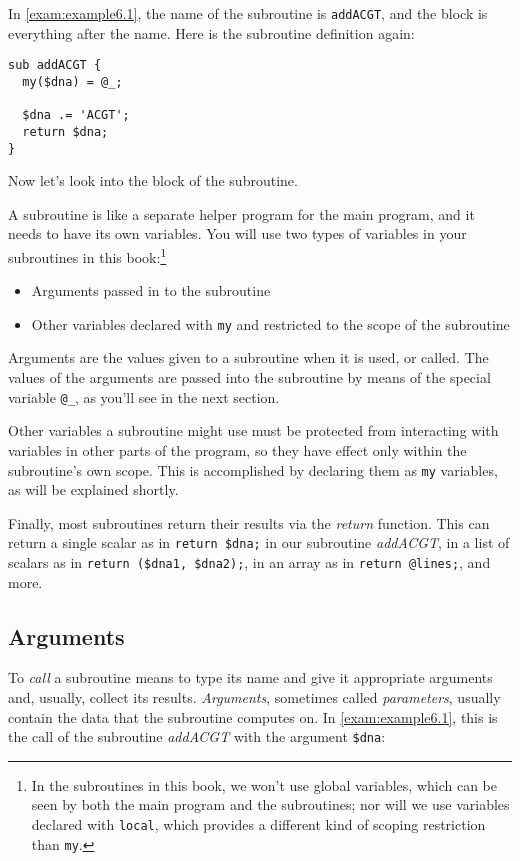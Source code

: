 In \autoref{exam:example6.1}, the name of the subroutine is \verb|addACGT|, and the block is everything after the name. Here is the subroutine definition again:

\begin{lstlisting}
sub addACGT {
  my($dna) = @_;

  $dna .= 'ACGT';
  return $dna;
}
\end{lstlisting}

Now let's look into the block of the subroutine.

A subroutine is like a separate helper program for the main program, and it needs to have its own variables. You will use two types of variables in your subroutines in this book:\footnote{In the subroutines in this book, we won't use global variables, which can be seen by both the main program and the subroutines; nor will we use variables declared with \verb|local|, which provides a different kind of scoping restriction than \verb|my|.}

\begin{itemize}
  \item Arguments passed in to the subroutine
  \item Other variables declared with \verb|my| and restricted to the scope of the subroutine
\end{itemize}

Arguments are the values given to a subroutine when it is used, or called. The values of the arguments are passed into the subroutine by means of the special variable \verb|@_|, as you'll see in the next section.

Other variables a subroutine might use must be protected from interacting with variables in other parts of the program, so they have effect only within the subroutine's own scope. This is accomplished by declaring them as \verb|my| variables, as will be explained shortly.

Finally, most subroutines return their results via the \textit{return} function. This can return a single scalar as in \verb|return $dna;| in our subroutine \textit{addACGT}, in a list of scalars as in \verb|return ($dna1, $dna2);|, in an array as in \verb|return @lines;|, and more. 

\subsection{Arguments}
To \textit{call} a subroutine means to type its name and give it appropriate arguments and, usually, collect its results. \textit{Arguments}, sometimes called \textit{parameters}, usually contain the data that the subroutine computes on. In \autoref{exam:example6.1}, this is the call of the subroutine \textit{addACGT} with the argument \verb|$dna|:

